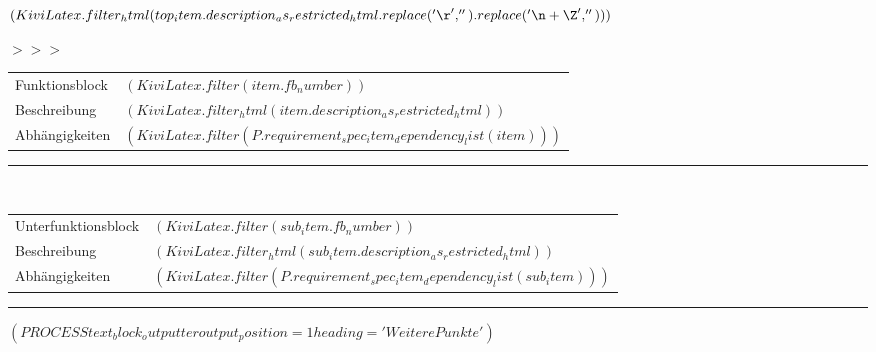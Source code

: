 \documentclass{scrartcl}
\begin{document}
\begin{CJK}{UTF8}{}
    $( KiviLatex.filter_html(top_item.description_as_restricted_html.replace('\r', '').replace('\n+\Z', '')) )$

    \vspace{0.5cm}
\parbox[t]{1.0cm}{\textcolor{kivitendodarkred}{$>>>$}}%
\parbox[t]{15.0cm}{%
\begin{longtable}{p{2.8cm}p{11.7cm}}
  Funktionsblock & $( KiviLatex.filter(item.fb_number) )$\\
  Beschreibung & $( KiviLatex.filter_html(item.description_as_restricted_html) )$\\
  Abhängigkeiten & $( KiviLatex.filter(P.requirement_spec_item_dependency_list(item)) )$
\end{longtable}}

\hspace*{1.15cm}\rule{15.2cm}{0.2pt}\\
\hspace*{1.0cm}%
\parbox[t]{15.0cm}{%
\begin{longtable}{p{2.8cm}p{11.7cm}}
  Unterfunktionsblock & $( KiviLatex.filter(sub_item.fb_number) )$\\
  Beschreibung & $( KiviLatex.filter_html(sub_item.description_as_restricted_html) )$\\
  Abhängigkeiten & $( KiviLatex.filter(P.requirement_spec_item_dependency_list(sub_item)) )$
\end{longtable}}


\vspace{0.2cm}
\hrule
\vspace{0.4cm}


%

$( PROCESS text_block_outputter output_position=1 heading='Weitere Punkte' )$

\end{CJK}
\end{document}
